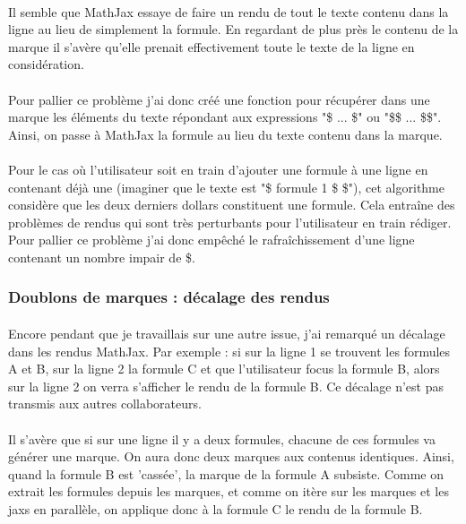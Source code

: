\documentclass[12pt]{article}
\begin{document}
\paragraph{}
Il semble que MathJax essaye de faire un rendu de tout le texte contenu dans la ligne au lieu de simplement la formule. En regardant de plus près le contenu de la marque il s'avère qu'elle prenait effectivement toute le texte de la ligne en considération.
\paragraph{}
Pour pallier ce problème j'ai donc créé une fonction pour récupérer dans une marque les éléments du texte répondant aux expressions "\$ ... \$" ou "\$\$ ... \$\$". Ainsi, on passe à MathJax la formule au lieu du texte contenu dans la marque.
\paragraph{}
Pour le cas où l'utilisateur soit en train d'ajouter une formule à une ligne en contenant déjà une (imaginer que le texte est "\$ formule 1 \$ \$"), cet algorithme considère que les deux derniers dollars constituent une formule. Cela entraîne des problèmes de rendus qui sont très perturbants pour l'utilisateur en train rédiger. Pour pallier ce problème j'ai donc empêché le rafraîchissement d'une ligne contenant un nombre impair de \$.\\

\subsubsection{Doublons de marques : décalage des rendus}
\paragraph{}
Encore pendant que je travaillais sur une autre issue, j'ai remarqué un décalage dans les rendus MathJax. Par exemple : si sur la ligne 1 se trouvent les formules A et B, sur la ligne 2 la formule C et que l'utilisateur focus la formule B, alors sur la ligne 2 on verra s'afficher le rendu de la formule B. Ce décalage n'est pas transmis aux autres collaborateurs.
\paragraph{}
Il s'avère que si sur une ligne il y a deux formules, chacune de ces formules va générer une marque. On aura donc deux marques aux contenus identiques. Ainsi, quand la formule B est 'cassée', la marque de la formule A subsiste. Comme on extrait les formules depuis les marques, et comme on itère sur les marques et les jaxs en parallèle, on applique donc à la formule C le rendu de la formule B.
\end{document}
